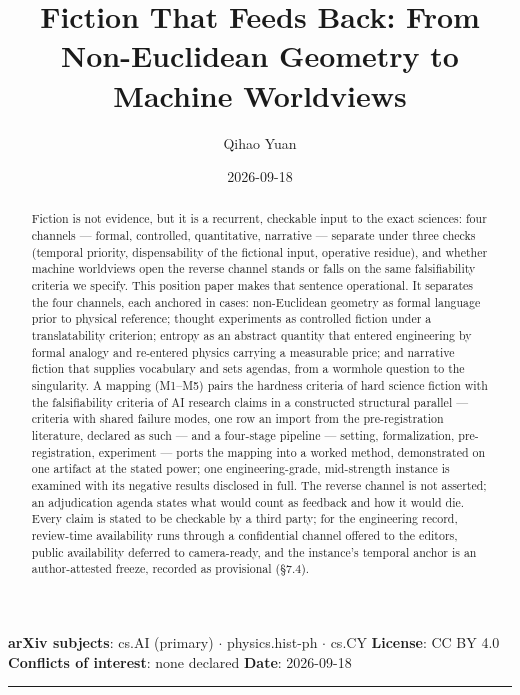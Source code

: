 \documentclass[11pt,a4paper]{article}
\title{Fiction That Feeds Back: From Non-Euclidean Geometry to Machine Worldviews}
\author{Qihao Yuan}
\date{2026-09-18}
\begin{document}
\maketitle
\thispagestyle{empty}
\vspace{0.5em}
\noindent\textbf{arXiv subjects}: cs.AI (primary) $\cdot$ physics.hist-ph $\cdot$ cs.CY \quad \textbf{License}: CC BY 4.0 \quad \textbf{Conflicts of interest}: none declared \quad \textbf{Date}: 2026-09-18
\vspace{0.5em}
\hrule
\vspace{0.8em}

\begin{abstract}


Fiction is not evidence, but it is a recurrent, checkable input to the exact sciences: four channels — formal, controlled, quantitative, narrative — separate under three checks (temporal priority, dispensability of the fictional input, operative residue), and whether machine worldviews open the reverse channel stands or falls on the same falsifiability criteria we specify. This position paper makes that sentence operational. It separates the four channels, each anchored in cases: non-Euclidean geometry as formal language prior to physical reference; thought experiments as controlled fiction under a translatability criterion; entropy as an abstract quantity that entered engineering by formal analogy and re-entered physics carrying a measurable price; and narrative fiction that supplies vocabulary and sets agendas, from a wormhole question to the singularity. A mapping (M1–M5) pairs the hardness criteria of hard science fiction with the falsifiability criteria of AI research claims in a constructed structural parallel — criteria with shared failure modes, one row an import from the pre-registration literature, declared as such — and a four-stage pipeline — setting, formalization, pre-registration, experiment — ports the mapping into a worked method, demonstrated on one artifact at the stated power; one engineering-grade, mid-strength instance is examined with its negative results disclosed in full. The reverse channel is not asserted; an adjudication agenda states what would count as feedback and how it would die. Every claim is stated to be checkable by a third party; for the engineering record, review-time availability runs through a confidential channel offered to the editors, public availability deferred to camera-ready, and the instance's temporal anchor is an author-attested freeze, recorded as provisional (§7.4).

\end{abstract}
\end{document}
